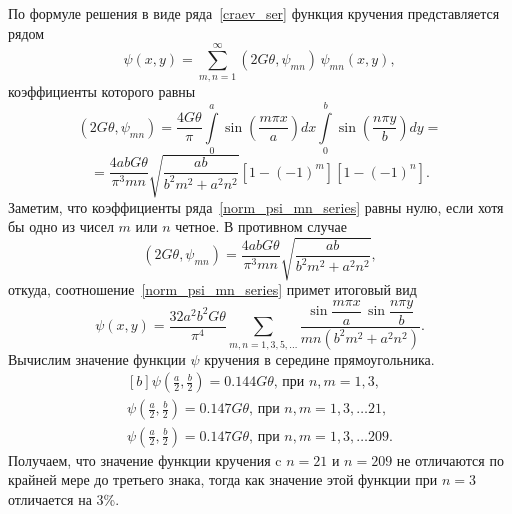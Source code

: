 \documentclass[12pt, a4paper]{article}
\begin{document}
По формуле решения в виде ряда~\eqref{craev_ser} функция кручения представляется рядом
\begin{equation}  \label{norm_psi_mn_series}
	\psi(x, y) = \sum_{m, n = 1}^\infty (2G \theta, \psi_{mn}) \, \psi_{mn}(x, y),
\end{equation}
коэффициенты которого равны
\[
(2G \theta, \psi_{mn}) = \frac{4 G \theta}{\pi}\int\limits_0^a \sin\left(\frac{m \pi x}{a}\right) dx \int\limits_0^b
\sin\left(\frac{n \pi y}{b}\right) dy = 
\]
\[
	= \frac{4abG\theta}{\pi^3 mn} \sqrt{\frac{ab}{b^2 m^2 + a^2 n^2}}[1 - (-1)^m][1 - (-1)^n].
\]
Заметим, что коэффициенты ряда~\eqref{norm_psi_mn_series} равны нулю, если
хотя бы одно из чисел $m$ или $n$ четное. В противном случае
\[
(2G \theta, \psi_{mn}) = \frac{4abG\theta}{\pi^3 mn} \sqrt{\frac{ab}{b^2 m^2 + a^2 n^2}},
\]
откуда, соотношение~\eqref{norm_psi_mn_series} примет итоговый вид
\begin{equation} 
	\label{energy_ans}
	\psi(x, y) = \frac{32 a^2 b^2 G\theta}{\pi^4} \!\!\! \sum_{m, n = 1, 3, 5, \ldots}
	\!\!\! \frac{\sin\dfrac{m\pi x}{a} \, \sin\dfrac{n\pi y}{b}}{mn(b^2 m^2 + a^2 n^2)}.
\end{equation}
Вычислим значение функции $\psi$ кручения в середине прямоугольника.
\begin{equation} 
	\label{psi_energy_middle}
	\begin{aligned}[b]
	\psi\left(\frac{a}{2}, \frac{b}{2}\right) = 0.144G\theta\mbox{, при } n, m = 1, 3, \\
	\psi\left(\frac{a}{2}, \frac{b}{2}\right) = 0.147G\theta\mbox{, при } n, m = 1, 3, \ldots21,\\
	\psi\left(\frac{a}{2}, \frac{b}{2}\right) = 0.147G\theta\mbox{, при } n, m = 1, 3, \ldots209.
	\end{aligned}
\end{equation}
Получаем, что значение функции кручения c $n = 21$ и $n = 209$ не отличаются по крайней мере до третьего знака, тогда как значение этой функции при $n = 3$ отличается на 3\%.
\end{document}
